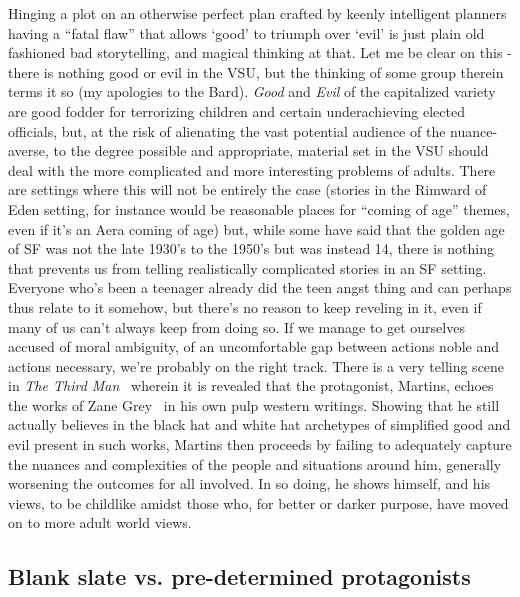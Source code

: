 Hinging a plot on an otherwise perfect plan crafted by keenly
intelligent planners having a ``fatal flaw'' that allows `good' to
triumph over `evil' is just plain old fashioned bad storytelling, and
magical thinking at that. Let me be clear on this - there is nothing
good or evil in the VSU, but the thinking of some group therein terms
it so (my apologies to the Bard).  \emph{Good} and \emph{Evil} of the
capitalized variety are good fodder for terrorizing children and
certain underachieving elected officials, but, at the risk of
alienating the vast potential audience of the nuance-averse, to the
degree possible and appropriate, material set in the VSU should deal
with the more complicated and more interesting problems of
adults. There are settings where this will not be entirely the case
(stories in the Rimward of Eden setting, for instance would be
reasonable places for ``coming of age'' themes, even if it's an Aera
coming of age) but, while some have said that the golden age of SF was
not the late 1930's to the 1950's but was instead 14, there is nothing that
prevents us from telling realistically complicated stories in an SF
setting. Everyone who's been a teenager already did the teen angst
thing and can perhaps thus relate to it somehow, but there's no reason
to keep reveling in it, even if many of us can't always keep from
doing so. If we manage to get ourselves accused of moral ambiguity, of
an uncomfortable gap between actions noble and actions necessary,
we're probably on the right track. There is a very telling scene in
\emph{The Third Man}~\cite{ThirdMan} wherein it is revealed that the
protagonist, Martins, echoes the works of Zane Grey~\cite{ZaneGrey} in
his own pulp western writings. Showing that he still actually believes
in the black hat and white hat archetypes of simplified good and evil
present in such works, Martins then proceeds by failing to adequately
capture the nuances and complexities of the people and situations
around him, generally worsening the outcomes for all involved. In so
doing, he shows himself, and his views, to be childlike amidst those
who, for better or darker purpose, have moved on to more adult world views.

\subsection{Blank slate vs. pre-determined protagonists}

